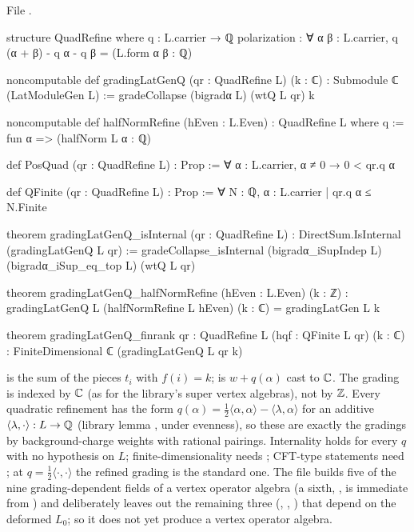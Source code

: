 \noindent File .
\begin{leancode}
structure QuadRefine where
  q : L.carrier → ℚ
  polarization : ∀ α β : L.carrier, q (α + β) - q α - q β = (L.form α β : ℚ)

noncomputable def gradingLatGenQ (qr : QuadRefine L) (k : ℂ) : Submodule ℂ (LatModuleGen L) :=
  gradeCollapse (bigradα L) (wtQ L qr) k

noncomputable def halfNormRefine (hEven : L.Even) : QuadRefine L where
  q := fun α => (halfNorm L α : ℚ)

def PosQuad (qr : QuadRefine L) : Prop := ∀ α : L.carrier, α ≠ 0 → 0 < qr.q α

def QFinite (qr : QuadRefine L) : Prop := ∀ N : ℚ, {α : L.carrier | qr.q α ≤ N}.Finite

theorem gradingLatGenQ_isInternal (qr : QuadRefine L) :
    DirectSum.IsInternal (gradingLatGenQ L qr) :=
  gradeCollapse_isInternal (bigradα_iSupIndep L) (bigradα_iSup_eq_top L) (wtQ L qr)

theorem gradingLatGenQ_halfNormRefine (hEven : L.Even) (k : ℤ) :
    gradingLatGenQ L (halfNormRefine L hEven) (k : ℂ) = gradingLatGen L k

theorem gradingLatGenQ_finrank {qr : QuadRefine L} (hqf : QFinite L qr) (k : ℂ) :
    FiniteDimensional ℂ (gradingLatGenQ L qr k)
\end{leancode}

\begin{dictionary}
 is the sum of the pieces $t_i$ with $f(i)=k$;  is $w+q(\alpha)$ cast to
${\mathbb{C}}$. The grading is indexed by ${\mathbb{C}}$ (as for the library's super vertex algebras), not by ${\mathbb{Z}}$. Every quadratic
refinement has the form $q(\alpha)=\frac12\langle\alpha,\alpha\rangle-\langle\lambda,\alpha\rangle$ for an additive
$\langle\lambda,\cdot\rangle:L\to{\mathbb{Q}}$ (library lemma , under evenness), so these are exactly the
gradings by background-charge weights with rational pairings. Internality holds for every $q$ with no hypothesis on $L$;
finite-dimensionality needs ; CFT-type statements need ; at $q=\frac12\langle\cdot,\cdot\rangle$ the
refined grading is the standard one. The file builds five of the nine grading-dependent fields of a vertex operator
algebra (a sixth, , is immediate from ) and deliberately leaves out the remaining three (, , ) that
depend on the deformed $L_0$; so it does not yet produce a vertex operator algebra.
\end{dictionary}

